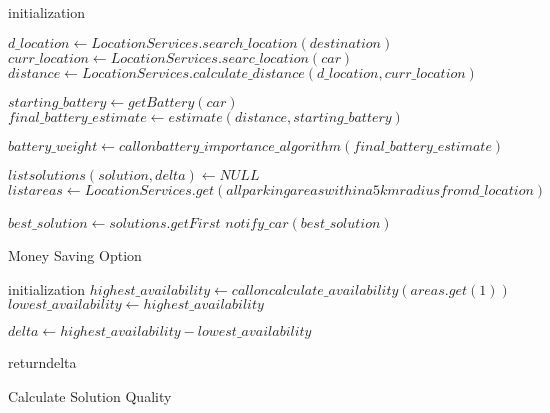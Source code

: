 

\begin{algorithm}[H]
	initialization\;
	
	$d\_location \leftarrow LocationServices.search\_location(destination)$\;
	$curr\_location \leftarrow LocationServices.searc\_location(car)$\;
	$distance \leftarrow LocationServices.calculate\_distance (d\_location, curr\_location)$\;
	
	$starting\_battery \leftarrow getBattery(car)$\;
	$final\_battery\_estimate \leftarrow estimate(distance, starting\_battery)$\;
	
	$battery\_weight \leftarrow call on battery\_importance\_algorithm(final\_battery\_estimate)$\;
	
	$list solutions(solution, delta) \leftarrow NULL$\;
	$list areas \leftarrow LocationServices.get(all parking areas within a 5km radius from d\_location)$\;
	
	
	$best\_solution \leftarrow solutions.getFirst$\;
	$notify\_car(best\_solution)$\;
	
	\caption{Money Saving Option}
\end{algorithm}



\begin{algorithm}
	initialization\;
	$highest\_availability \leftarrow call on calculate\_availability(areas.get(1))$\;
	$lowest\_availability \leftarrow highest\_availability$\;
	
	$delta \leftarrow highest\_availability - lowest\_availability$\;
	
	return{delta}\;
	\caption{Calculate Solution Quality}
\end{algorithm}




